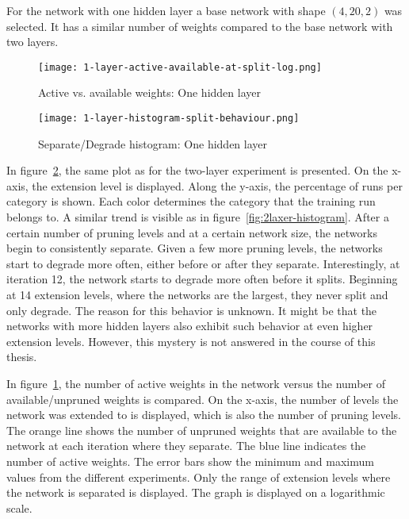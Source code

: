 For the network with one hidden layer a base network with shape $(4,20,2)$ was selected.
It has a similar number of weights compared to the base network with two layers.

\begin{figure}[ht]
    \centering
    \texttt{[image: 1-layer-active-available-at-split-log.png]}
    \caption{Active vs. available weights: One hidden layer
    }\label{fig:1layer-active}
\end{figure}

\begin{figure}[ht]
    \centering
    \texttt{[image: 1-layer-histogram-split-behaviour.png]}
    \caption{Separate/Degrade histogram: One hidden layer
    }\label{fig:1layer-histogram}
\end{figure}

In figure~\ref{fig:1layer-histogram}, the same plot as for the two-layer experiment is presented.
On the x-axis, the extension level is displayed. 
Along the y-axis, the percentage of runs per category is shown.
Each color determines the category that the training run belongs to.
A similar trend is visible as in figure~\ref{fig:2laxer-histogram}.
After a certain number of pruning levels and at a certain network size, the networks begin to consistently separate.
Given a few more pruning levels, the networks start to degrade more often, either before or after they separate.
Interestingly, at iteration 12, the network starts to degrade more often before it splits.
Beginning at 14 extension levels, where the networks are the largest, they never split and only degrade.
The reason for this behavior is unknown.
It might be that the networks with more hidden layers also exhibit such behavior at even higher extension levels. 
However, this mystery is not answered in the course of this thesis.

In figure~\ref{fig:1layer-active}, the number of active weights in the network versus the number of available/unpruned weights is compared.
On the x-axis, the number of levels the network was extended to is displayed, which is also the number of pruning levels.
The orange line shows the number of unpruned weights that are available to the network at each iteration where they separate.
The blue line indicates the number of active weights.
The error bars show the minimum and maximum values from the different experiments.
Only the range of extension levels where the network is separated is displayed.
The graph is displayed on a logarithmic scale.

